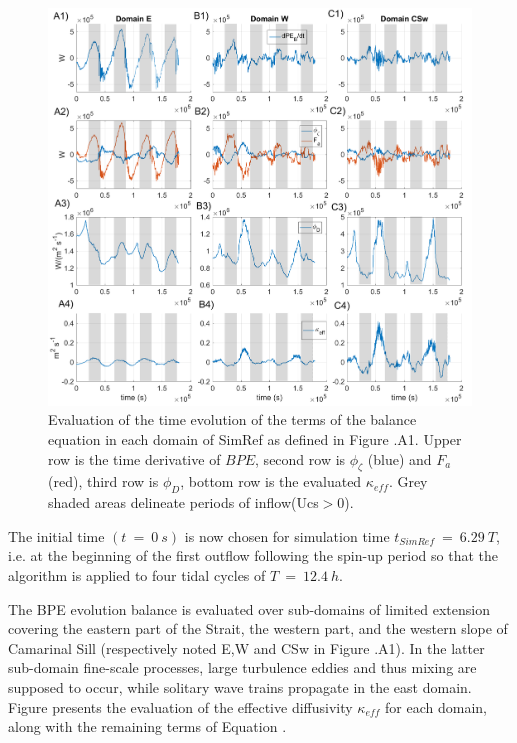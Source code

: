 \begin{figure}[h!]
\centering
\includegraphics[width=1\textwidth]{./CHAP_BPE/Fig_Kappa_CS_colOut.png}
\caption[Evaluation of $\kappa_{eff}$ in different sub-domains of SimRef]{Evaluation of the time evolution of the terms of the balance equation  in each domain of SimRef as defined in Figure .A1. Upper row is the time derivative of $BPE$, second row is $\phi_{\zeta}$ (blue) and $F_a$ (red), third row is $\phi_D$, bottom row is the evaluated $\kappa_{eff}$. Grey shaded areas delineate periods of inflow\color{red}(Ucs$>$0)\color{black}.}
\label{figCgbr2d}
\end{figure}
The initial time $(t\ =\ 0\ s)$ is now chosen for simulation time $t_{SimRef}\ =\ 6.29\ T$, i.e. at the beginning of the first outflow following the spin-up period so that the algorithm is applied to four tidal cycles of $T\ =\ 12.4\ h$.

The BPE evolution balance is evaluated over sub-domains of limited extension covering the eastern part of the Strait, the western part, and the western slope of Camarinal Sill (respectively noted E,W and CSw in Figure .A1). In the latter sub-domain fine-scale processes, large turbulence eddies and thus mixing are supposed to occur, while solitary wave trains propagate in the east domain. Figure  presents the evaluation of the effective diffusivity $\kappa_{eff}$ for each domain, along with the remaining terms of Equation .

